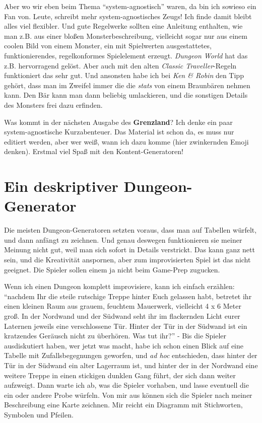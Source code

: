 \documentclass[11pt]{wbzine}
\begin{document}
Aber wo wir eben beim Thema ``system-agnostisch'' waren, 
da bin ich sowieso ein Fan von. Leute, schreibt mehr
system-agnostisches Zeugs! Ich finde damit bleibt alles viel
flexibler. Und gute Regelwerke sollten eine Anleitung enthalten, wie
man z.B. aus einer bloßen Monsterbeschreibung, vielleicht sogar nur
aus einem coolen Bild von einem Monster, ein mit Spielwerten
ausgestattetes, funktionierendes, regelkonformes Spielelement erzeugt.
\textit{Dungeon World} hat das z.B. hervorragend gelöst. Aber auch
mit den alten \textit{Classic Traveller}-Regeln funktioniert das
sehr gut. Und ansonsten habe ich bei \textit{Ken \& Robin} den Tipp
gehört, dass man im Zweifel immer die die \textit{stats} von einem
Braunbären nehmen kann. Den Bär kann man dann beliebig umlackieren,
und die sonstigen Details des
Monsters frei dazu erfinden.


Was kommt in der nächsten Ausgabe des \textbf{Grenzland}? Ich denke
ein paar system-agnostische Kurzabenteuer. Das Material ist schon
da, es muss nur editiert werden, aber wer weiß, wann ich dazu komme
(hier zwinkernden Emoji denken). Erstmal viel Spaß mit den
Kontent-Generatoren!


\section{Ein deskriptiver Dungeon-Generator}

Die meisten Dungeon-Generatoren setzten voraus, dass man auf
Tabellen würfelt, und dann anfängt zu zeichnen. Und genau deswegen
funktionieren sie meiner Meinung nicht gut, weil man sich sofort in
Details verstrickt. Das kann ganz nett sein, und die Kreativität
anspornen, aber zum improvisierten Spiel ist das nicht geeignet. Die
Spieler sollen einem ja nicht beim Game-Prep zugucken.

Wenn ich einen Dungeon komplett improvisiere, kann ich einfach
erzählen: ``nachdem Ihr die steile rutschige Treppe hinter Euch
gelassen habt,  betretet ihr einen kleinen Raum aus grauem,
feuchtem Mauerwerk, vielleicht 4 x 6 Meter groß. In der Nordwand und
der Südwand seht ihr im flackernden Licht eurer Laternen jeweils
eine verschlossene Tür.  Hinter der Tür in der Südwand ist ein
kratzendes Geräusch nicht zu überhören. Was tut ihr?'' - Bis die
Spieler 
ausdiskutiert haben, wer jetzt was macht, habe ich schon einen Blick
auf eine Tabelle mit Zufallsbegegnungen geworfen, und \textit{ad
hoc} entschieden, dass hinter der Tür in der Südwand ein alter Lagerraum ist,
und hinter der in der Nordwand eine weitere Treppe in einen
stickigen dunklen Gang führt, der sich dann weiter aufzweigt. Dann
warte ich ab, was die Spieler vorhaben, und lasse eventuell die ein
oder andere Probe würfeln. Von
mir aus können sich die Spieler nach meiner Beschreibung eine Karte
zeichnen. Mir reicht ein Diagramm mit Stichworten, Symbolen und
Pfeilen.
\end{document}
